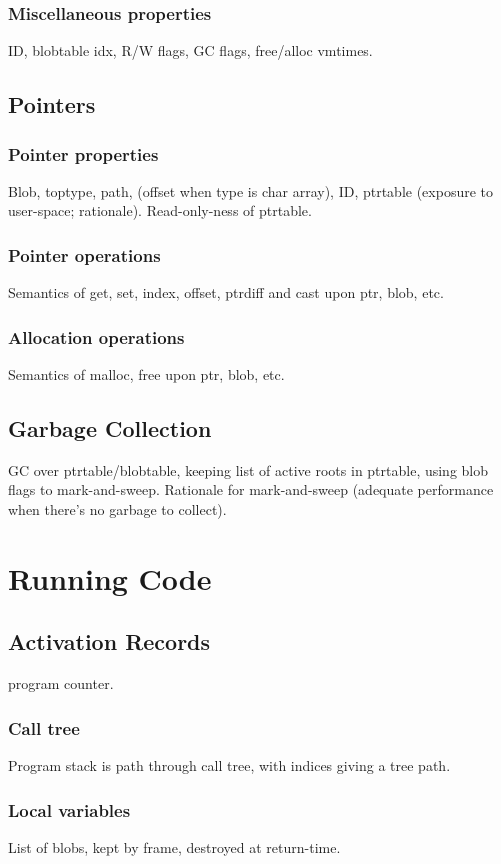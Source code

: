 \subsubsection{Miscellaneous properties}
ID, blobtable idx, R/W flags, GC flags, free/alloc vmtimes.

\subsection{Pointers}
\subsubsection{Pointer properties}
Blob, toptype, path, (offset when type is char array), ID, ptrtable
(exposure to user-space; rationale). Read-only-ness of ptrtable.
\subsubsection{Pointer operations}
Semantics of get, set, index, offset, ptrdiff and cast upon ptr, blob, etc.
\subsubsection{Allocation operations}
Semantics of malloc, free upon ptr, blob, etc.

\subsection{Garbage Collection}
GC over ptrtable/blobtable, keeping list of active roots in ptrtable,
using blob flags to mark-and-sweep. Rationale for mark-and-sweep
(adequate performance when there's no garbage to collect).


\section{Running Code}
\subsection{Activation Records}
program counter.
\subsubsection{Call tree}
Program stack is path through call tree, with indices giving a tree
path.
\subsubsection{Local variables}
List of blobs, kept by frame, destroyed at return-time.
